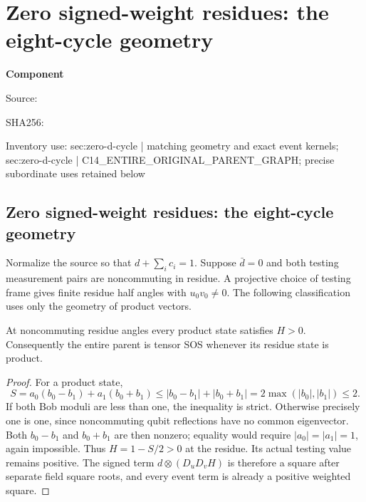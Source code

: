\chapter{Zero signed-weight residues: the eight-cycle geometry}
\label{component:p76173e99815f}
\noindent\textbf{Component }\par
{\small\noindent Source: \par}
{\small\noindent SHA256: \par}
{\small\noindent Inventory use: sec:zero-d-cycle | matching geometry and exact event kernels; sec:zero-d-cycle | C14\_\allowbreak{}ENTIRE\_\allowbreak{}ORIGINAL\_\allowbreak{}PARENT\_\allowbreak{}GRAPH; precise subordinate uses retained below\par}
\medskip
\section{Zero signed-weight residues: the eight-cycle geometry}\label{p76173e99815f:sec:zero-d-cycle}
Normalize the source so that $d+\sum_i c_i=1$. Suppose $\bar d=0$ and both testing measurement pairs are noncommuting in residue. A projective choice of testing frame gives finite residue half angles with $u_0v_0\ne0$. The following classification uses only the geometry of product vectors.

\begin{lemma}
At noncommuting residue angles every product state satisfies $H>0$. Consequently the entire parent is tensor SOS whenever its residue state is product.
\end{lemma}
\begin{proof}
For a product state,
\[
S=a_0(b_0-b_1)+a_1(b_0+b_1)
\le |b_0-b_1|+|b_0+b_1|=2\max(|b_0|,|b_1|)\le2.
\]
If both Bob moduli are less than one, the inequality is strict. Otherwise precisely one is one, since noncommuting qubit reflections have no common eigenvector. Both $b_0-b_1$ and $b_0+b_1$ are then nonzero; equality would require $|a_0|=|a_1|=1$, again impossible. Thus $H=1-S/2>0$ at the residue. Its actual testing value remains positive. The signed term $d\otimes(D_uD_vH)$ is therefore a square after separate field square roots, and every event term is already a positive weighted square.
\end{proof}

